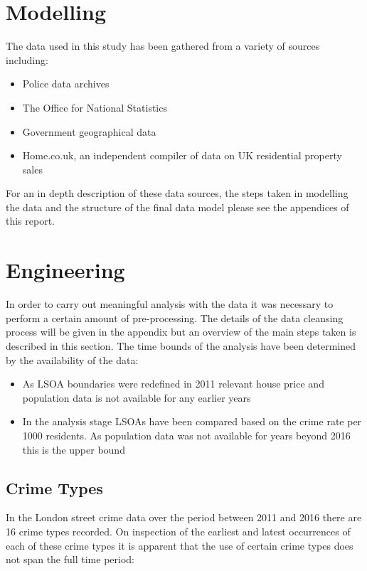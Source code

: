 \documentclass{article}
\begin{document}
\section{Modelling} \label{Modelling}
The data used in this study has been gathered from a variety of sources including:
\begin{itemize}
\item Police data archives
\item The Office for National Statistics
\item Government geographical data
\item Home.co.uk, an independent compiler of data on UK residential property sales
\end{itemize}

For an in depth description of these data sources, the steps taken in modelling the data and the structure of the final data model please see the appendices of this report.

\section{Engineering} \label{Engineering}
In order to carry out meaningful analysis with the data it was necessary to perform a certain amount of pre-processing. The details of the data cleansing process will be given in the appendix but an overview of the main steps taken is described in this section. The time bounds of the analysis have been determined by the availability of the data:

\begin{itemize}
\item As LSOA boundaries were redefined in 2011 relevant house price and population data is not available for any earlier years
\item In the analysis stage LSOAs have been compared based on the crime rate per 1000 residents. As population data was not available for years beyond 2016 this is the upper bound
\end{itemize}
\smallskip


\subsection{Crime Types}
In the London street crime data over the period between 2011 and 2016 there are 16 crime types recorded. On inspection of the earliest and latest occurrences of each of these crime types it is apparent that the use of certain crime types does not span the full time period:
\end{document}
